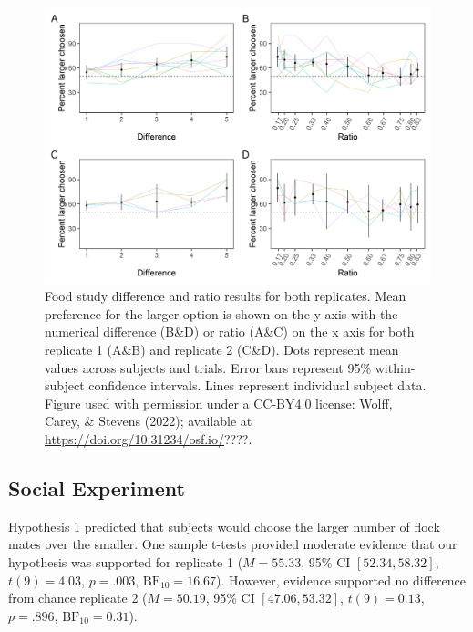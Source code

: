 \documentclass[
  ,doc,floatsintext]{apa6}
\begin{document}
\begin{figure}

{\centering \includegraphics[width=1\linewidth]{../figures/food_figure} 

}

\caption{Food study difference and ratio results for both replicates. Mean preference for the larger option is shown on the y axis with the numerical difference (B\&D) or ratio (A\&C) on the x axis for both replicate 1 (A\&B) and replicate 2 (C\&D). Dots represent mean values across subjects and trials. Error bars represent 95\% within-subject confidence intervals. Lines represent individual subject data. Figure used with permission under a CC-BY4.0 license: Wolff, Carey, \& Stevens (2022); available at \url{https://doi.org/10.31234/osf.io/}????.}\label{fig:foodgraphs}
\end{figure}

\hypertarget{social-experiment-1}{%
\subsection{Social Experiment}\label{social-experiment-1}}

Hypothesis 1 predicted that subjects would choose the larger number of flock mates over the smaller. One sample t-tests provided moderate evidence that our hypothesis was supported for replicate 1 (\(M = 55.33\), 95\% CI \([52.34, 58.32]\), \(t(9) = 4.03\), \(p = .003\), \(\mathrm{BF}_{\textrm{10}} = 16.67\)). However, evidence supported no difference from chance replicate 2 (\(M = 50.19\), 95\% CI \([47.06, 53.32]\), \(t(9) = 0.13\), \(p = .896\), \(\mathrm{BF}_{\textrm{10}} = 0.31\)).
\end{document}

